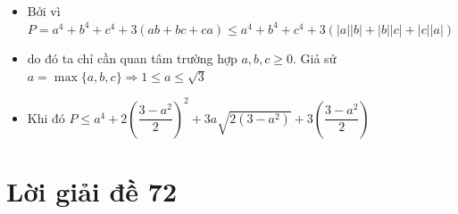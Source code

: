\lgi 
\begin{itemize}[label=,leftmargin=*]
\item Bởi vì $P=a^4+b^4+c^4+3(ab+bc+ca)\le a^4+b^4+c^4+3\left(|a||b|+|b||c|+|c||a| \right)$
\item do đó ta chỉ cần quan tâm trường hợp $a,b,c\ge 0$. Giả sử $a=\max \{a,b,c \}\Rightarrow 1 \le a\le \sqrt{3}$
\item Khi đó $P\le a^4+2\left(\dfrac{3-a^2}{2} \right)^2 +3a\sqrt{2(3-a^2)}+3\left(\dfrac{3-a^2}{2} \right) $
\end{itemize}

\section{Lời giải đề 72}

